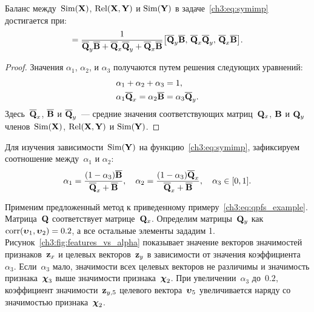 \begin{statement}
	Баланс между~$\text{Sim}(\mathbf{X})$, $\text{Rel}(\mathbf{X}, \mathbf{Y})$ и $\text{Sim}(\mathbf{Y})$ в  задаче~\eqref{ch3:eq:symimp} достигается при:
	\begin{equation}
	[\alpha_1, \alpha_2, \alpha_3] = \frac{1}{\overline{\bQ}_y \overline{\bB} + \overline{\bQ}_x \overline{\bQ}_y + \overline{\bQ}_x \overline{\bB}}\bigl[\overline{\bQ}_y \overline{\bB}, \, \overline{\bQ}_x \overline{\bQ}_y, \, \overline{\bQ}_x \overline{\bB}\bigr].
	\label{ch3:eq:alpha_3}
	\end{equation}
\end{statement}
\begin{proof}
	Значения $\alpha_1$, $\alpha_2$, и $\alpha_3$ получаются путем решения следующих уравнений:
	\begin{align*}
		&\alpha_1 + \alpha_2 + \alpha_3 = 1, \\
		&\alpha_1 \overline{\mathbf{Q}}_x = \alpha_2 \overline{\mathbf{B}} = \alpha_3 \overline{\mathbf{Q}}_y.
	\end{align*}
	Здесь~$\overline{\mathbf{Q}}_x$, $\overline{\mathbf{B}}$ и $\overline{\mathbf{Q}}_y$~--- средние значения соответствующих матриц~$\mathbf{Q}_x$, $\mathbf{B}$ и $\mathbf{Q}_y$ членов~$\text{Sim}(\mathbf{X})$, $\text{Rel}(\mathbf{X}, \mathbf{Y})$ и $\text{Sim}(\mathbf{Y})$.
\end{proof}
Для изучения зависимости~$\text{Sim}(\mathbf{Y})$ на функцию~\eqref{ch3:eq:symimp}, зафиксируем соотношение между~$\alpha_1$ и $\alpha_2$:
\begin{equation}
	\alpha_1 = \frac{(1 - \alpha_3)\overline{\mathbf{B}}}{\overline{\mathbf{Q}}_x + \overline{\mathbf{B}}}, \quad
	\alpha_2 = \frac{(1 - \alpha_3)\overline{\mathbf{Q}}_x}{\overline{\mathbf{Q}}_x + \overline{\mathbf{B}}}, \quad
	\alpha_3 \in [0, 1].
	\label{ch3:eq:alphas3}
\end{equation}

Применим предложенный метод к приведенному примеру~\eqref{ch3:eq:qpfs_example}.
Матрица~$\mathbf{Q}$ соответствует матрице~$\mathbf{Q}_x$.
Определим матрицы~$\mathbf{Q}_y$ как $\text{corr}(\boldsymbol{\upsilon}_1, \boldsymbol{\upsilon}_2) = 0.2$, а все остальные элементы зададим 1.
Рисунок~\ref{ch3:fig:features_vs_alpha} показывает значение векторов значимостей признаков~$\mathbf{z}_x$ и целевых векторов~$\mathbf{z}_y$ в зависимости от значения коэффициента~$\alpha_3$.
Если~$\alpha_3$ мало, значимости всех целевых векторов не различимы и значимость признака~$\boldsymbol{\chi}_3$ выше значимости признака~$\boldsymbol{\chi}_2$. При увеличении~$\alpha_3$ до~$0.2$, коэффициент значимости~$\mathbf{z}_{y,5}$ целевого вектора~$\boldsymbol{\upsilon}_5$ увеличивается наряду со значимостью признака~$\boldsymbol{\chi}_2$.

